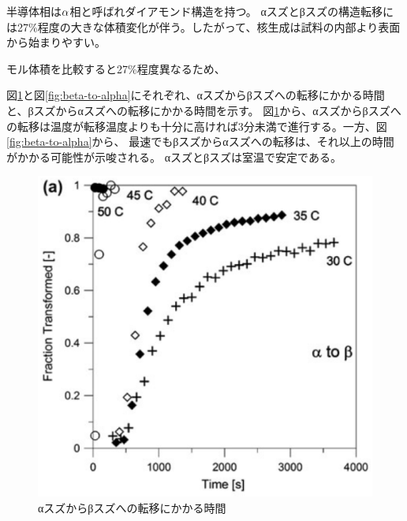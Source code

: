 半導体相は$\rm \alpha$相と呼ばれダイアモンド構造を持つ。
αスズとβスズの構造転移には27\%程度の大きな体積変化が伴う。したがって、核生成は試料の内部より表面から始まりやすい\cite{Cornelius}。

モル体積を比較すると27\%程度異なるため、

図\ref{fig:alpha-to-beta}と図\ref{fig:beta-to-alpha}にそれぞれ、αスズからβスズへの転移にかかる時間と、βスズからαスズへの転移にかかる時間を示す\cite{Nogita}。
図\ref{fig:alpha-to-beta}から、αスズからβスズへの転移は温度が転移温度よりも十分に高ければ3分未満で進行する。一方、図\ref{fig:beta-to-alpha}から、
最速でもβスズからαスズへの転移は、それ以上の時間がかかる可能性が示唆される。
αスズとβスズは室温で安定である。
\begin{figure}[!h]
 \begin{minipage}{0.5\hsize}
  \begin{center}
   \includegraphics[width=\hsize]{Introduction/alpha-to-beta.eps}
  \end{center}
  \caption{αスズからβスズへの転移にかかる時間}
  \label{fig:alpha-to-beta}
 \end{minipage}
 \begin{minipage}{0.5\hsize}
    \begin{center}

\end{center}
\end{minipage}
\end{figure}
